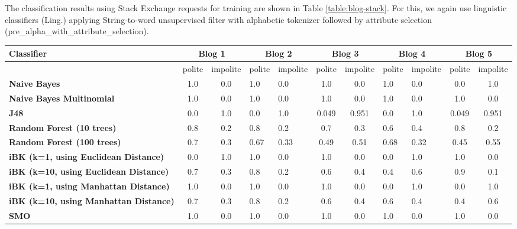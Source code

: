 \documentclass[conference]{IEEEtran}
\begin{document}
The classification results using Stack Exchange requests for training are shown in Table \ref{table:blog-stack}. For this, we again use linguistic classifiers (Ling.) applying String-to-word unsupervised filter with alphabetic tokenizer followed by attribute selection (pre\_alpha\_with\_attribute\_selection). 

\begin{table*}[htbp]
\caption{Classification results using Stack Exchange requests for training}
\centering
\vspace{5pt}
\begin{tabular}{|l|c|c|l|l|c|c|l|l|c|c|}
\hline
\textbf{Classifier} & \multicolumn{2}{|c|}{\textbf{Blog 1}} & \multicolumn{2}{|c|}{\textbf{Blog 2}} & \multicolumn{2}{|c|}{\textbf{Blog 3}} & \multicolumn{2}{|c|}{\textbf{Blog 4}} & \multicolumn{2}{|c|}{\textbf{Blog 5}} \\
\hline
& polite & impolite & polite & impolite & polite & impolite & polite & impolite & polite & impolite \\
\hline\hline
\textbf{Naive Bayes} & 1.0 & 0.0 & 1.0 & 0.0 & 1.0 & 0.0 & 1.0 & 0.0 & 0.0 & 1.0 \\ 
\hline
\textbf{Naive Bayes Multinomial} & 1.0 & 0.0 & 1.0 & 0.0 & 1.0 & 0.0 & 1.0 & 0.0 & 1.0 & 0.0 \\ 
\hline
\textbf{J48} & 0.0 & 1.0 & 0.0 & 1.0 & 0.049 & 0.951 & 0.0 & 1.0 & 0.049 & 0.951 \\ 
\hline
\textbf{Random Forest (10 trees)} & 0.8 & 0.2 & 0.8 & 0.2 & 0.7 & 0.3 & 0.6 & 0.4 & 0.8 & 0.2 \\ 
\hline
\textbf{Random Forest (100 trees)} & 0.7 & 0.3 & 0.67 & 0.33 & 0.49 & 0.51 & 0.68 & 0.32 & 0.45 & 0.55 \\ 
\hline
\textbf{iBK (k=1, using Euclidean Distance)} & 0.0 & 1.0 & 1.0 & 0.0 & 1.0 & 0.0 & 0.0 & 1.0 & 1.0 & 0.0 \\ 
\hline
\textbf{iBK (k=10, using Euclidean Distance)} & 0.7 & 0.3 & 0.8 & 0.2 & 0.6 & 0.4 & 0.4 & 0.6 & 0.9 & 0.1 \\ 
\hline
\textbf{iBK (k=1, using Manhattan Distance)} & 1.0 & 0.0 & 1.0 & 0.0 & 1.0 & 0.0 & 0.0 & 1.0 & 0.0 & 1.0 \\ 
\hline
\textbf{iBK (k=10, using Manhattan Distance)} & 0.7 & 0.3 & 0.8 & 0.2 & 0.6 & 0.4 & 0.6 & 0.4 & 0.4 & 0.6 \\ 
\hline
\textbf{SMO} & 1.0 & 0.0 & 1.0 & 0.0 & 1.0 & 0.0 & 1.0 & 0.0 & 1.0 & 0.0 \\ 
\hline
\hline
\end{tabular}
\label{table:blog-stack}
\end{table*}
\end{document}
